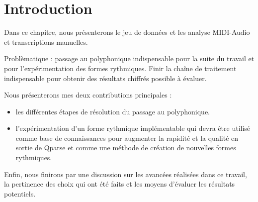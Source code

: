 \section*{Introduction}
Dans ce chapitre, nous présenterons le jeu de données et les analyse MIDI-Audio
et transcriptions manuelles.

Problèmatique : passage au polyphonique indispensable pour la suite du travail
et pour l’expérimentation des formes rythmiques. Finir la chaîne de
traitement indispensable pour obtenir des résultats chiffrés possible à
évaluer.

Nous présenterons mes deux contributions principales :
\begin{itemize}
    \item les différentes étapes de résolution du passage au polyphonique.
    \item l’expérimentation d’un forme rythmique implémentable qui devra être
        utilisé comme base de connaissances pour augmenter la rapidité et la
        qualité en sortie de Qparse et comme une méthode de création de
        nouvelles formes rythmiques.
\end{itemize}

Enfin, nous finirons par une discussion sur
les avancées réalisées dans ce travail, la pertinence des choix qui ont été
faits et les moyens d’évaluer les résultats potentiels.

